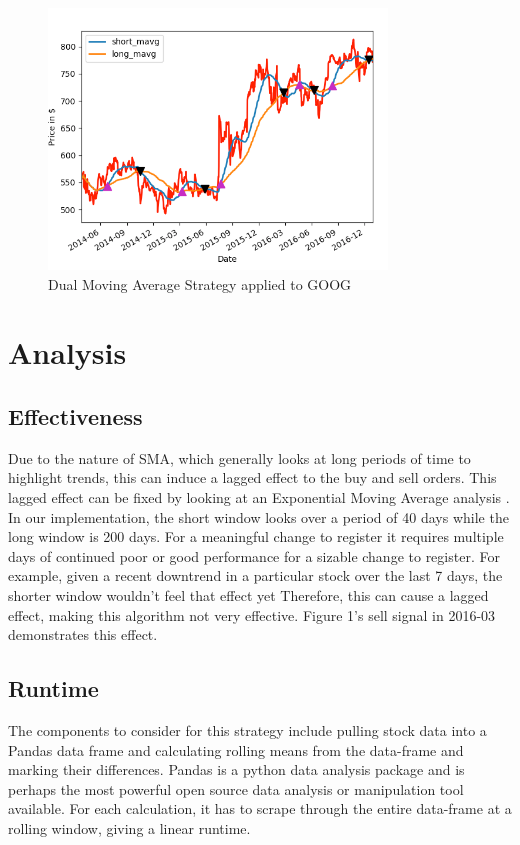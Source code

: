 \documentclass[letterpaper,11pt]{article}
\begin{document}
\begin{figure}[ht!]
\centering
\includegraphics[width=90mm]{SMA_Google.png}
\caption{Dual Moving Average Strategy applied to GOOG \label{overflow}}
\end{figure}

\section*{Analysis}

\subsection*{Effectiveness}
Due to the nature of SMA, which generally looks at long periods of time to highlight trends, this can induce a lagged effect to the buy and sell orders. This lagged effect can be fixed by looking at an Exponential Moving Average analysis \cite{Ehlers}. In our implementation, the short window looks over a period of 40 days while the long window is 200 days. For a meaningful change to register it requires multiple days of continued poor or good performance for a sizable change to register. For example, given a recent downtrend in a particular stock over the last 7 days, the shorter window wouldn't feel that effect yet Therefore, this can cause a lagged effect, making this algorithm not very effective. Figure 1's sell signal in 2016-03 demonstrates this effect.

\subsection*{Runtime}
The components to consider for this strategy include pulling stock data into a Pandas data frame and calculating rolling means from the data-frame and marking their differences. Pandas is a python data analysis package and is perhaps the most powerful open source data analysis or manipulation tool available. For each calculation, it has to scrape through the entire data-frame at a rolling window, giving a linear runtime.
\end{document}
